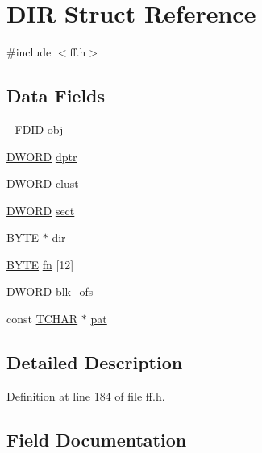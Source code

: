\hypertarget{structDIR}{}\section{D\+IR Struct Reference}
\label{structDIR}


{\ttfamily \#include $<$ff.\+h$>$}

\subsection*{Data Fields}
\begin{DoxyCompactItemize}
\item 
\hyperlink{struct__FDID}{\+\_\+\+F\+D\+ID} \hyperlink{structDIR_a5a4848c51616bf4ad90518c211ca3bb3}{obj}
\item 
\hyperlink{integer_8h_ad342ac907eb044443153a22f964bf0af}{D\+W\+O\+RD} \hyperlink{structDIR_a0330e9554e1f38795debe4495156873e}{dptr}
\item 
\hyperlink{integer_8h_ad342ac907eb044443153a22f964bf0af}{D\+W\+O\+RD} \hyperlink{structDIR_acfbb8ba2d6e73b6f999ceffd1857c190}{clust}
\item 
\hyperlink{integer_8h_ad342ac907eb044443153a22f964bf0af}{D\+W\+O\+RD} \hyperlink{structDIR_ad01fcc812ed0dad11a593574336adc9e}{sect}
\item 
\hyperlink{integer_8h_a4ae1dab0fb4b072a66584546209e7d58}{B\+Y\+TE} $\ast$ \hyperlink{structDIR_a6c2a8c0cf2d55ae99775e93a16593449}{dir}
\item 
\hyperlink{integer_8h_a4ae1dab0fb4b072a66584546209e7d58}{B\+Y\+TE} \hyperlink{structDIR_ad90d974c0e7640307598c586bf141b32}{fn} \mbox{[}12\mbox{]}
\item 
\hyperlink{integer_8h_ad342ac907eb044443153a22f964bf0af}{D\+W\+O\+RD} \hyperlink{structDIR_afdb5d6302a88eaf5d43da0352ca2cc91}{blk\+\_\+ofs}
\item 
const \hyperlink{ff_8h_a03bdb8ce5895c7e261aadc2529637546}{T\+C\+H\+AR} $\ast$ \hyperlink{structDIR_a1f636884096de91deb97f59209d60e96}{pat}
\end{DoxyCompactItemize}


\subsection{Detailed Description}


Definition at line 184 of file ff.\+h.



\subsection{Field Documentation}
\mbox{\label{structDIR_afdb5d6302a88eaf5d43da0352ca2cc91}} 
